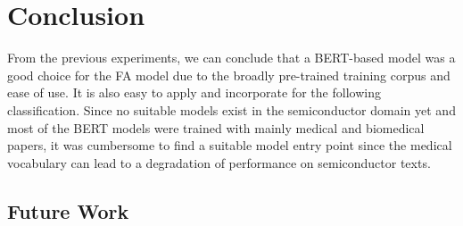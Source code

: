 \chapter{Conclusion} \label{chapter:conclusion}
From the previous experiments, we can conclude that a BERT-based model was a good choice for the FA model due to the broadly pre-trained training corpus and ease of use. It is also easy to apply and incorporate for the following classification. Since no suitable models exist in the semiconductor domain yet and most of the BERT models were trained with mainly medical and biomedical papers, it was cumbersome to find a suitable model entry point since the medical vocabulary can lead to a degradation of performance on semiconductor texts.
\section{Future Work}